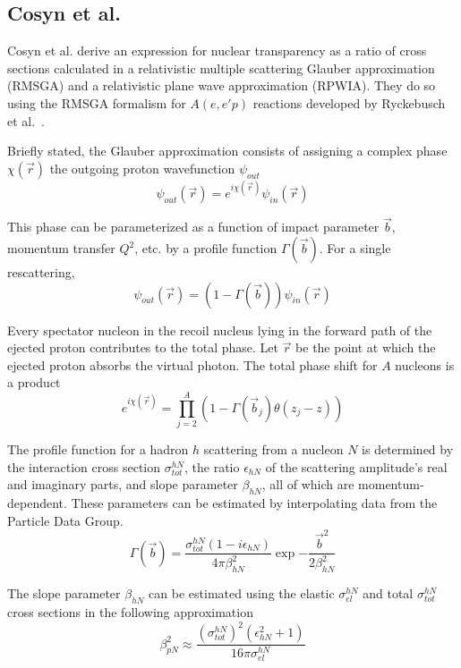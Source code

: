 \subsection{Cosyn et al.}

Cosyn et al. derive an expression for nuclear transparency as a ratio of cross
sections calculated in
a relativistic multiple scattering Glauber approximation (RMSGA)
and
a relativistic plane wave approximation (RPWIA).
They do so using the RMSGA formalism for $A(e,e'p)$ reactions developed by
Ryckebusch et al.~\cite{Ryckebusch_2003}.


Briefly stated, the Glauber approximation consists of assigning a complex phase
$\chi(\vec{r})$ the outgoing proton wavefunction $\psi_{out}$
\begin{equation}
    \psi_{out}(\vec{r}) = e^{i\chi(\vec{r})} \psi_{in}(\vec{r})
\end{equation}

This phase can be parameterized as a function of impact parameter $\vec{b}$,
momentum transfer $Q^2$, etc. by a profile function $\Gamma(\vec{b})$.
For a single rescattering,
\begin{equation}
    \psi_{out}(\vec{r}) = (1-\Gamma(\vec{b})) \psi_{in}(\vec{r})
\end{equation}

Every spectator nucleon in the recoil nucleus lying in the forward path of the
ejected proton contributes to the total phase.
Let $\vec{r}$ be the point at which the ejected proton absorbs the virtual
photon.
The total phase shift for $A$ nucleons is a product
\begin{equation}
    e^{i\chi(\vec{r})} = \prod_{j=2}^{A} \left(1-\Gamma(\vec{b}_j)\theta(z_j-z)\right)
\end{equation}

The profile function for a hadron $h$ scattering from a nucleon $N$ is
determined by
the interaction cross section $\sigma^{hN}_{tot}$,
the ratio $\epsilon_{hN}$ of the scattering amplitude's real and imaginary parts,
and slope parameter $\beta_{hN}$,
all of which are momentum-dependent.
These parameters can be estimated by interpolating data from the Particle Data
Group.
\begin{equation}
    \Gamma(\vec{b}) =
        \frac{\sigma^{hN}_{tot}(1-i\epsilon_{hN})}
             {4\pi\beta_{hN}^2}
        \exp{-\frac{\vec{b}^2}{2\beta_{hN}^2}}
\end{equation}

The slope parameter $\beta_{hN}$ can be estimated using
the elastic $\sigma^{hN}_{el}$ and total $\sigma^{hN}_{tot}$ cross sections
in the following
approximation
\begin{equation}
    \beta_{p N}^{2} \approx
            \frac{(\sigma^{hN}_{tot})^{2} (\epsilon_{hN}^{2}+1)}
                 {16 \pi \sigma^{hN}_{el}}
\end{equation}

